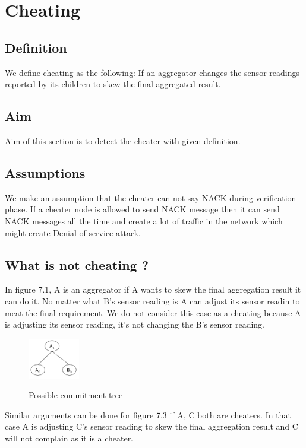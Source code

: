 \chapter{Cheating}

\section{Definition}
We define cheating as the following: If an aggregator changes the sensor readings reported by its children to skew the final aggregated result.

\section{Aim}
Aim of this section is to detect the cheater with given definition. 

\section{Assumptions}
We make an assumption that the cheater can not say NACK during verification phase. If a cheater node is allowed to send NACK message then it can send NACK messages all the time and create a lot of traffic in the network which might create Denial of service attack. 

\section{What is not cheating ?}
	
	In figure 7.1, A is an aggregator if A wants to skew the final aggregation result it can do it. No matter what B's sensor reading is A can adjust its sensor readin to meat the final requirement. 
	We do not consider this case as a cheating because A is adjusting its sensor reading, it's not changing the B's sensor reading. 
  
	\begin{figure}[t]
		\centering
			\includegraphics[width=0.2\textwidth]{commitment_tree_1.png}\\
			\caption{Possible commitment tree}
		\label{fig:figure2}
	\end{figure}

	Similar arguments can be done for figure 7.3 if A, C  both are cheaters. In that case A is adjusting C's sensor reading to skew the final aggregation result and C will not complain as it is a cheater.

